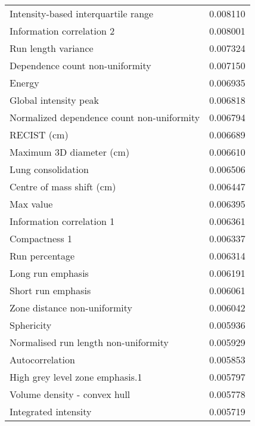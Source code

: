 \begin{longtable}{|lr|}
Intensity-based interquartile range                &        0.008110 \\
Information correlation 2                          &        0.008001 \\
Run length variance                                &        0.007324 \\
Dependence count non-uniformity                    &        0.007150 \\
Energy                                             &        0.006935 \\
Global intensity peak                              &        0.006818 \\
Normalized dependence count non-uniformity         &        0.006794 \\
RECIST (cm)                                        &        0.006689 \\
Maximum 3D diameter (cm)                           &        0.006610 \\
Lung consolidation                                 &        0.006506 \\
Centre of mass shift (cm)                          &        0.006447 \\
Max value                                          &        0.006395 \\
Information correlation 1                          &        0.006361 \\
Compactness 1                                      &        0.006337 \\
Run percentage                                     &        0.006314 \\
Long run emphasis                                  &        0.006191 \\
Short run emphasis                                 &        0.006061 \\
Zone distance non-uniformity                       &        0.006042 \\
Sphericity                                         &        0.005936 \\
Normalised run length non-uniformity               &        0.005929 \\
Autocorrelation                                    &        0.005853 \\
High grey level zone emphasis.1                    &        0.005797 \\
Volume density - convex hull                       &        0.005778 \\
Integrated intensity                               &        0.005719 \\

\end{longtable}
